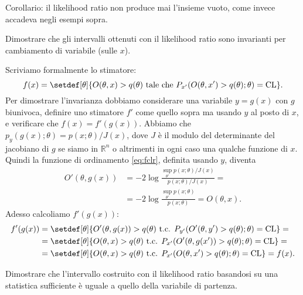 Corollario: il likelihood ratio non produce mai l'insieme vuoto, come invece
accadeva negli esempi sopra.

\begin{exercise} \label{ex:lrinv}
    Dimostrare che gli intervalli ottenuti con il likelihood ratio sono
    invarianti per cambiamento di variabile (sulle $x$).
\end{exercise}

\begin{solution}
    Scriviamo formalmente lo stimatore:
    \begin{equation*}
        f(x) = \setdef[\theta]{O(\theta,x) > q(\theta) \text{ tale che }
        P_{x'}(O(\theta,x') > q(\theta);\theta) = \mathrm{CL}}.
    \end{equation*}
    Per dimostrare l'invarianza dobbiamo considerare una variabile $y = g(x)$
    con $g$ biunivoca, definire uno stimatore $f'$ come quello sopra ma usando
    $y$ al posto di $x$, e verificare che $f(x) = f'(g(x))$. Abbiamo che
    $p_y(g(x);\theta) = p(x;\theta)/J(x)$, dove $J$ è il modulo del
    determinante del jacobiano di $g$ se siamo in $\mathbb R^n$ o altrimenti in
    ogni caso una qualche funzione di $x$. Quindi la funzione di ordinamento
    \eqref{eq:fclr}, definita usando $y$, diventa
    \begin{align*}
        O'(\theta, g(x)) &= -2\log\frac
        {\sup_{\theta'} p(x;\theta)/J(x)}{p(x;\theta)/J(x)} = \\
        &= -2\log\frac
        {\sup_{\theta'} p(x;\theta)}{p(x;\theta)}
        = O(\theta, x).
    \end{align*}
    Adesso calcoliamo $f'(g(x))$:
    \begin{align*}
        f'(g(x))
        &= \setdef[\theta]{O'(\theta,g(x)) > q(\theta) \text{ t.c. }
        P_{y'}(O'(\theta, y') > q(\theta);\theta) = \mathrm{CL}} = \\
        &= \setdef[\theta]{O(\theta,x) > q(\theta) \text{ t.c. }
        P_{x'}(O'(\theta, g(x')) > q(\theta);\theta) = \mathrm{CL}} = \\
        &= \setdef[\theta]{O(\theta,x) > q(\theta) \text{ t.c. }
        P_{x'}(O(\theta, x') > q(\theta);\theta) = \mathrm{CL}}
        = f(x).
    \end{align*}
\end{solution}

\begin{exercise}
    Dimostrare che l'intervallo costruito con il likelihood ratio basandosi su
    una statistica sufficiente è uguale a quello della variabile di partenza.
\end{exercise}

